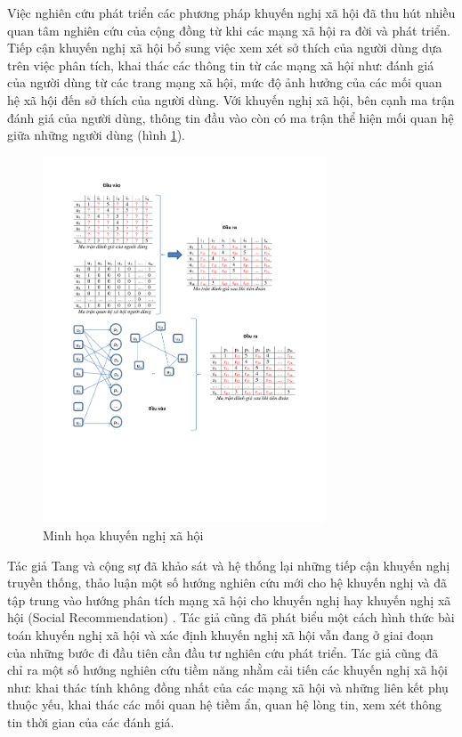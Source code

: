 Việc nghiên cứu phát triển các phương pháp khuyến nghị xã hội đã thu hút nhiều quan tâm nghiên cứu của cộng đồng từ khi các mạng xã hội ra đời và phát triển. Tiếp cận khuyến nghị xã hội bổ sung việc xem xét sở thích của người dùng dựa trên việc phân tích, khai thác các thông tin từ các mạng xã hội như: đánh giá của người dùng từ các trang mạng xã hội, mức độ ảnh hưởng của các mối quan hệ xã hội đến sở thích của người dùng. Với khuyến nghị xã hội, bên cạnh ma trận đánh giá của người dùng, thông tin đầu vào còn có ma trận thể hiện mối quan hệ giữa những người dùng (hình \ref{fig:figure_1_4}).

\begin{figure}[ht]
\begin{center}
  \includegraphics[width=0.75\textwidth]{Figure_1_4.pdf}
  \caption{Minh họa khuyến nghị xã hội}\label{fig:figure_1_4}
\end{center}
\end{figure}

Tác giả Tang và cộng sự đã khảo sát và hệ thống lại những tiếp cận khuyến nghị truyền thống, thảo luận một số hướng nghiên cứu mới cho hệ khuyến nghị và đã tập trung vào hướng phân tích mạng xã hội cho khuyến nghị hay khuyến nghị xã hội (Social Recommendation) \cite{JiliangTang:2013SocialRecommendation}. Tác giả cũng đã phát biểu một cách hình thức bài toán khuyến nghị xã hội và xác định khuyến nghị xã hội vẫn đang ở giai đoạn của những bước đi đầu tiên cần đầu tư nghiên cứu phát triển. Tác giả cũng đã chỉ ra một số hướng nghiên cứu tiềm năng nhằm cải tiến các khuyến nghị xã hội như: khai thác tính không đồng nhất của các mạng xã hội và những liên kết phụ thuộc yếu, khai thác các mối quan hệ tiềm ẩn, quan hệ lòng tin, xem xét thông tin thời gian của các đánh giá. 

